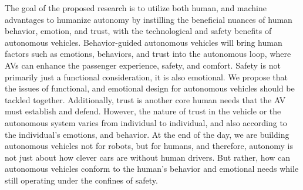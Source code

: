 The goal of the proposed research is to utilize both human, and machine advantages to humanize autonomy by instilling the beneficial nuances of human behavior, emotion, and trust, with the technological and safety benefits of autonomous vehicles.
Behavior-guided autonomous vehicles will bring human factors such as emotions, behaviors, and trust into the autonomous loop, where AVs can enhance the passenger experience, safety, and comfort.
Safety is not primarily just a functional consideration, it is also emotional. We propose that the issues of functional, and emotional design for autonomous vehicles should be tackled together.
Additionally, trust is another core human needs that the AV must establish and defend. However, the nature of trust in the vehicle or the autonomous system varies from individual to individual, and also according to the individual's emotions, and behavior.
At the end of the day, we are building autonomous vehicles not for robots, but for humans, and therefore, autonomy is not just about how clever cars are without human drivers. But rather, how can autonomous vehicles conform to the human's behavior and emotional needs while still operating under the confines of safety.

